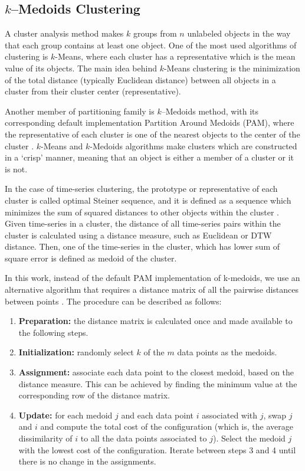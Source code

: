 
\subsection{$k$--Medoids Clustering }
\label{Sec:kMedoidsClustering}

A cluster analysis method makes $k$ groups from $n$ unlabeled objects in the way that each group contains at least one object. One of the most used algorithms of clustering is $k$-Means, where each cluster has a representative which is the mean value of its objects. The main idea behind $k$-Means clustering is the minimization of the total distance (typically Euclidean distance) between all objects in a cluster from their cluster center (representative).

Another member of partitioning family is $k$--Medoids method, with its corresponding default implementation Partition Around Medoids (PAM), where the representative of each cluster is one of the nearest objects to the center of the cluster \cite{Kaufman2009}. $k$-Means and $k$-Medoids algorithms make clusters which are constructed in a `crisp' manner, meaning that an object is either a member of a cluster or it is not.

In the case of time-series clustering, the prototype or representative of each cluster is called optimal Steiner sequence, and it is defined as a sequence which minimizes the sum of squared distances to other objects within the cluster \cite{Kaufman2009}. Given time-series in a cluster, the distance of all time-series pairs within the cluster is calculated using a distance measure, such as Euclidean or DTW distance. Then, one of the time-series in the cluster, which has lower sum of square error is defined as medoid of the cluster.

In this work, instead of the default PAM implementation of k-medoids, we use an alternative algorithm that requires a distance matrix of all the pairwise distances between points \cite{Park2009}. The procedure can be described as follows:

\begin{enumerate}
    \item \textbf{Preparation:} the distance matrix is calculated once and made available to the following steps.
    \item \textbf{Initialization:} randomly select $k$ of the $m$ data points as the medoids.
    \item \textbf{Assignment:} associate each data point to the closest medoid, based on the distance measure. This can be achieved by finding the minimum value at the corresponding row of the distance matrix.
    \item \textbf{Update:} for each medoid $j$ and each data point $i$ associated with $j$, swap $j$ and $i$ and compute the total cost of the configuration (which is, the average dissimilarity of $i$ to all the data points associated to $j$). 
    Select the medoid $j$ with the lowest cost of the configuration. Iterate between steps 3 and 4 until there is no change in the assignments.
\end{enumerate}

